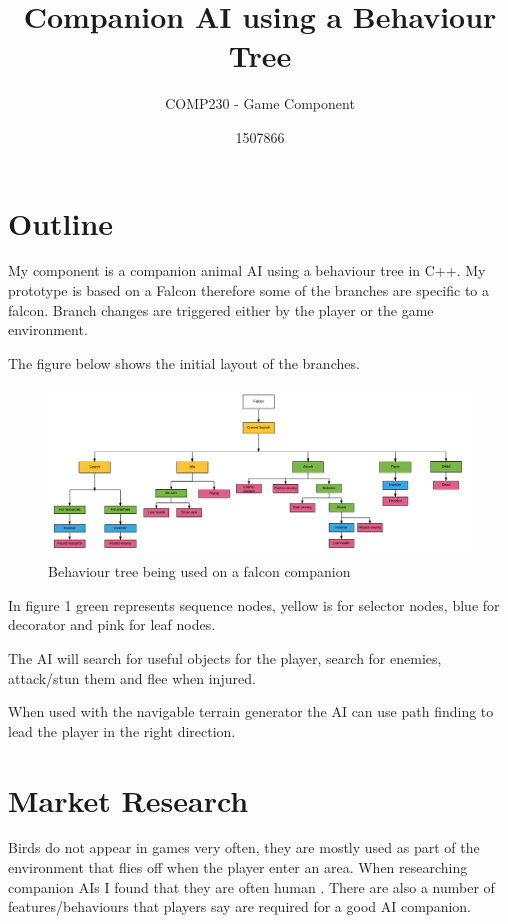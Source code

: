 \documentclass{scrartcl}
\title{ Companion AI using a Behaviour Tree }
\subtitle{COMP230 - Game Component}
\author{1507866}
\begin{document}
	
\maketitle
	
\section{Outline}
My component is a companion animal AI using a behaviour tree in C++. My prototype is based on a Falcon therefore some of the branches are specific to a falcon.  Branch changes are triggered either by the player or the game environment. 



The figure below shows the initial layout of the branches.
\begin{figure}[h]
	\includegraphics[width=1.2\linewidth]{behaviour_tree.png}
	\caption{ Behaviour tree being used on a falcon companion}
\end{figure} 

In figure 1 green represents sequence nodes, yellow is for selector nodes, blue for decorator and pink for leaf nodes.

The AI will search for useful objects for the player, search for enemies, attack/stun them and flee when injured.

When used with the navigable terrain generator the AI can use path finding to lead the player in the right direction. 

\section{Market Research}
Birds do not appear in games very often, they are mostly used as part of the environment that flies off when the player enter an area.
When researching companion AIs I found that they are often human \cite{DragonAge, LastOfUs, Bioshock}. There are also a number of features/behaviours that players say are required for a good AI companion. 
\end{document}
